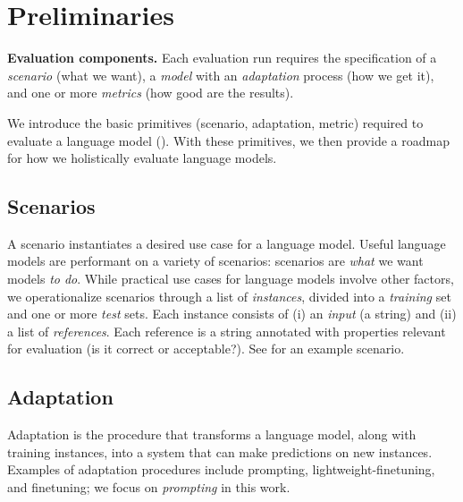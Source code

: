 \hypertarget{preliminaries}{\section{Preliminaries}}
\label{sec:preliminaries}

{\textbf{Evaluation components.} Each evaluation run requires the specification of 
a \textit{scenario} (what we want), 
a \textit{model} with an \textit{adaptation} process (how we get it), 
and one or more \textit{metrics} (how good are the results).
}

We introduce the basic primitives (scenario, adaptation, metric) required to evaluate a language model ().
With these primitives, we then provide a roadmap for how we holistically evaluate language models. 

\hypertarget{preliminaries-scenarios}{\subsection{Scenarios}}
\label{sec:preliminaries-scenarios}
A scenario instantiates a desired use case for a language model.
Useful language models are performant on a variety of scenarios: scenarios are \textit{what} we want models \textit{to do}.
While practical use cases for language models involve other factors, we operationalize scenarios through a list of \emph{instances},
divided into a \emph{training} set and one or more \emph{test} sets.
Each instance consists of (i) an \emph{input} (a string) and (ii) a list of \emph{references}.
Each reference is a string annotated with properties relevant for evaluation (\eg is it correct or acceptable?).
See  for an example scenario.




\hypertarget{preliminaries-adaptation}{\subsection{Adaptation}}
\label{sec:preliminaries-adaptation}

Adaptation is the procedure that transforms a language model, along with training instances, into a system that can make predictions on new instances.  
Examples of adaptation procedures include prompting, lightweight-finetuning, and finetuning; we focus on \textit{prompting} in this work.

